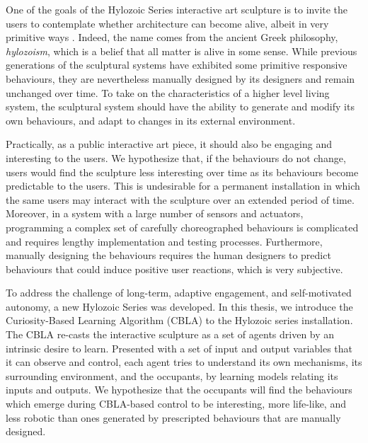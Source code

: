 One of the goals of the Hylozoic Series interactive art sculpture is to invite the users to contemplate whether architecture can become alive, albeit in very primitive ways \cite{Beesley2012}. Indeed, the name comes from the ancient Greek philosophy, \textit{hylozoism}, which is a belief that all matter is alive in some sense. While previous generations of the sculptural systems have exhibited some primitive responsive behaviours, they are nevertheless manually designed by its designers and remain unchanged over time. To take on the characteristics of a higher level living system, the sculptural system should have the ability to generate and modify its own behaviours, and adapt to changes in its external environment.

Practically, as a public interactive art piece, it should also be engaging and interesting to the users. We hypothesize that, if the behaviours do not change, users would find the sculpture less interesting over time as its behaviours become predictable to the users. This is undesirable for a permanent installation in which the same users may interact with the sculpture over an extended period of time. 
Moreover, in a system with a large number of sensors and actuators, programming a complex set of carefully choreographed behaviours is complicated and requires lengthy implementation and testing processes. Furthermore, manually designing the behaviours requires the human designers to predict behaviours that could induce positive user reactions, which is very subjective. 

To address the challenge of long-term, adaptive engagement, and self-motivated autonomy, a new Hylozoic Series was developed. In this thesis, we introduce the Curiosity-Based Learning Algorithm (CBLA) to the Hylozoic series installation. The CBLA re-casts the interactive sculpture as a set of agents driven by an intrinsic desire to learn. Presented with a set of input and output variables that it can observe and control, each agent tries to understand its own mechanisms, its surrounding environment, and the occupants, by learning models relating its inputs and outputs. We hypothesize that the occupants will find the behaviours which emerge during CBLA-based control to be interesting, more life-like, and less robotic than ones generated by prescripted behaviours that are manually designed. 

